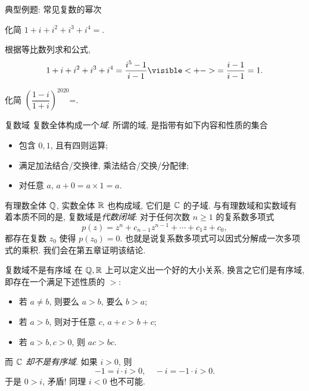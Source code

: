 \begin{frame}{典型例题: 常见复数的幂次}
	\onslide<+->
	\begin{example}
		化简 $1+i+i^2+i^3+i^4=$.
	\end{example}
	\onslide<+->
	\begin{solution}
		根据等比数列求和公式,
		\[1+i+i^2+i^3+i^4=\frac{i^5-1}{i-1}
		\visible<+->{=\frac{i-1}{i-1}=1.}\]
	\end{solution}
	\onslide<+->
	\begin{exercise}[2020年A卷]
		化简 $\left(\dfrac{1-i}{1+i}\right)^{2020}$=.
	\end{exercise}
\end{frame}


\begin{frame}{复数域\noexer}
	\onslide<+->
	复数全体构成一个\emph{域}.
	\onslide<+->
	所谓的域, 是指带有如下内容和性质的集合
	\begin{itemize}
		\item 包含 $0,1$, 且有四则运算;
		\item 满足加法结合/交换律, 乘法结合/交换/分配律;
		\item 对任意 $a$, $a+0=a\times 1=a$.
	\end{itemize}
	\onslide<+->
	有理数全体 ${\mathbb{Q}}$, 实数全体 ${\mathbb{R}}$ 也构成域, 它们是 ${\mathbb{C}}$ 的子域.
	\onslide<+->
	与有理数域和实数域有着本质不同的是, 复数域是\emph{代数闭域}:
	\onslide<+->
	对于任何次数 $n\ge 1$ 的复系数多项式
		\[p(z)=z^n+c_{n-1}z^{n-1}+\cdots+c_1z+c_0,\]
	都存在复数 $z_0$ 使得 $p(z_0)=0$.
	\onslide<+->
	也就是说复系数多项式可以因式分解成一次多项式的乘积.
	\onslide<+->
	我们会在第五章证明该结论.
\end{frame}


\begin{frame}{复数域不是有序域\noexer}
	\onslide<+->
	在 ${\mathbb{Q}},{\mathbb{R}}$ 上可以定义出一个好的大小关系,
	\onslide<+->
	换言之它们是有序域, 即存在一个满足下述性质的 $>$:
	\begin{itemize}
		\item 若 $a\neq b$, 则要么 $a>b$, 要么 $b>a$;
		\item 若 $a>b$, 则对于任意 $c$, $a+c>b+c$;
		\item 若 $a>b,c>0$, 则 $ac>bc$.
	\end{itemize}
	\onslide<+->
	而 \emph{${\mathbb{C}}$ 却不是有序域}.
	\onslide<+->
	如果 $i>0$, 则
		\[-1=i\cdot i>0,\quad -i=-1\cdot i>0.\]
	\onslide<+->
	于是 $0>i$, 矛盾! 同理 $i<0$ 也不可能.
\end{frame}



